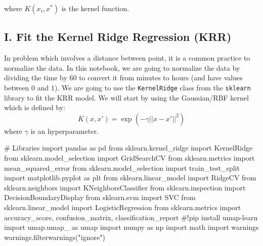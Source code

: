 \documentclass[
  letterpaper,
  DIV=11,
  numbers=noendperiod]{scrartcl}
\newenvironment{Shaded}{\begin{snugshade}}{\end{snugshade}}
\newcommand{\CommentTok}[1]{\textcolor[rgb]{0.37,0.37,0.37}{#1}}
\newcommand{\ImportTok}[1]{\textcolor[rgb]{0.00,0.46,0.62}{#1}}
\newcommand{\NormalTok}[1]{\textcolor[rgb]{0.00,0.23,0.31}{#1}}
\newcommand{\StringTok}[1]{\textcolor[rgb]{0.13,0.47,0.30}{#1}}
\begin{document}
where \(K(x_i, x^*)\) is the kernel function.

\subsection{I. Fit the Kernel Ridge Regression
(KRR)}\label{i.-fit-the-kernel-ridge-regression-krr}

In problem which involves a distance between point, it is a common
practice to normalize the data. In this notebook, we are going to
normalize the data by dividing the time by 60 to convert it from minutes
to hours (and have values between 0 and 1). We are going to use the
\texttt{KernelRidge} class from the \texttt{sklearn} library to fit the
KRR model. We will start by using the Gaussian/RBF kernel which is
defined by: \[
K(x, x') = \exp\left(-\gamma||x - x'||^2\right)
\] where \(\gamma\) is an hyperparameter.

\begin{Shaded}
\begin{Highlighting}[]
\CommentTok{\# Libraries}
\ImportTok{import}\NormalTok{ pandas }\ImportTok{as}\NormalTok{ pd }
\ImportTok{from}\NormalTok{ sklearn.kernel\_ridge }\ImportTok{import}\NormalTok{ KernelRidge}
\ImportTok{from}\NormalTok{ sklearn.model\_selection }\ImportTok{import}\NormalTok{ GridSearchCV}
\ImportTok{from}\NormalTok{ sklearn.metrics }\ImportTok{import}\NormalTok{ mean\_squared\_error}
\ImportTok{from}\NormalTok{ sklearn.model\_selection }\ImportTok{import}\NormalTok{ train\_test\_split}
\ImportTok{import}\NormalTok{ matplotlib.pyplot }\ImportTok{as}\NormalTok{ plt}
\ImportTok{from}\NormalTok{ sklearn.linear\_model }\ImportTok{import}\NormalTok{ RidgeCV}
\ImportTok{from}\NormalTok{ sklearn.neighbors }\ImportTok{import}\NormalTok{ KNeighborsClassifier}
\ImportTok{from}\NormalTok{ sklearn.inspection }\ImportTok{import}\NormalTok{ DecisionBoundaryDisplay}
\ImportTok{from}\NormalTok{ sklearn.svm }\ImportTok{import}\NormalTok{ SVC}
\ImportTok{from}\NormalTok{ sklearn.linear\_model }\ImportTok{import}\NormalTok{ LogisticRegression}
\ImportTok{from}\NormalTok{ sklearn.metrics }\ImportTok{import}\NormalTok{ accuracy\_score, confusion\_matrix, classification\_report}
\CommentTok{\#!pip install umap{-}learn}
\ImportTok{import}\NormalTok{ umap.umap\_ }\ImportTok{as}\NormalTok{ umap}
\ImportTok{import}\NormalTok{ numpy }\ImportTok{as}\NormalTok{ np}
\ImportTok{import}\NormalTok{ math}
\ImportTok{import}\NormalTok{ warnings}
\NormalTok{warnings.filterwarnings(}\StringTok{"ignore"}\NormalTok{)}
\end{Highlighting}
\end{Shaded}
\end{document}
